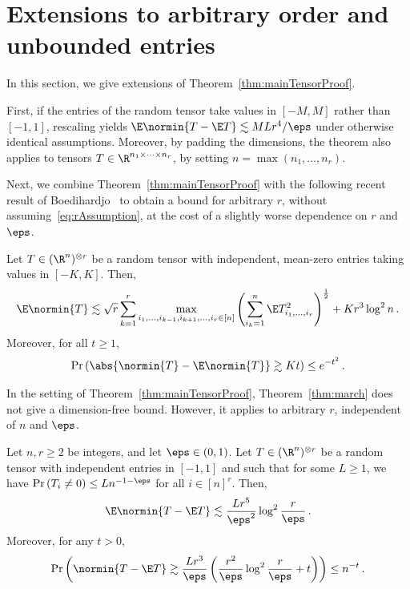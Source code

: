 \documentclass[11pt,a4paper]{article}
\begin{document}
\section{Extensions to arbitrary order and unbounded entries}
\label{sec:extensions}

In this section, we give extensions of Theorem~\ref{thm:mainTensorProof}.

First, if the entries of the random tensor take values in $[-M, M]$ rather than $[-1, 1]$, rescaling yields $\E \normin{T - \E T} \lesssim MLr^4/\eps$ under otherwise identical assumptions.
Moreover, by padding the dimensions, the theorem also applies to tensors $T\in \R^{n_1 \times \dots \times n_r}$, by setting $n = \max(n_1, \ldots, n_r)$.

Next, we combine Theorem~\ref{thm:mainTensorProof} with the following recent result of Boedihardjo~\cite{marchTensor} to
obtain a bound for arbitrary
$r$, without assuming~\eqref{eq:rAssumption},
at the cost of a slightly worse
dependence on $r$ and $\eps$.

\begin{theorem}\label{thm:march}
    Let $T\in (\R^n)^{\otimes r}$
    be a random tensor with 
    independent, mean-zero entries taking
    values in $[-K,K]$. Then,
    \[
        \E \normin{T}\lesssim \sqrt r \sum_{k=1}^r \max_{\substack{i_1, \ldots, i_{k-1}, i_{k+1}, \ldots, i_r\in [n]}} \left(\sum_{i_k=1}^n \E T^2_{i_1, \ldots, i_r}\right)^{\frac 12} + K r^3 \log^2 n\,.
    \]
    Moreover, for all $t\ge 1$,
    \[
        \Pr \left(\abs{\normin{T}- \E \normin{T}} \gtrsim Kt\right) \le e^{-t^2}\,.
    \]
\end{theorem}

\noindent In the setting of Theorem~\ref{thm:mainTensorProof}, Theorem~\ref{thm:march} does not give a
dimension-free bound. However, it applies to arbitrary $r$, independent of $n$ and $\eps$.

\begin{corollary}\label{corollary:unconstrainedorder}
    Let $n,r\ge 2$ be integers,
    and let $\eps\in (0,1)$.
    Let $T\in (\R^n)^{\otimes r}$ be
    a random tensor with independent
    entries in $[-1,1]$
    and such that for some $L\ge 1$, we have $\Pr\left(T_i\neq 0\right)\le Ln^{-1-\eps}$ for all $i\in [n]^r$. Then,
    \[
        \E \normin{T - \E T}\lesssim \frac {Lr^5} {\eps^2}\log^2 \frac r \eps\,.
    \]
    Moreover, for any $t>0$,
    \[
        \Pr\left(\normin{T - \E T}\gtrsim \frac {Lr^3} {\eps}\left( \frac {r^2} {\eps}\log^2 \frac r \eps + t\right)\right)\le n^{-t}\,.
    \]
\end{corollary}
\end{document}
